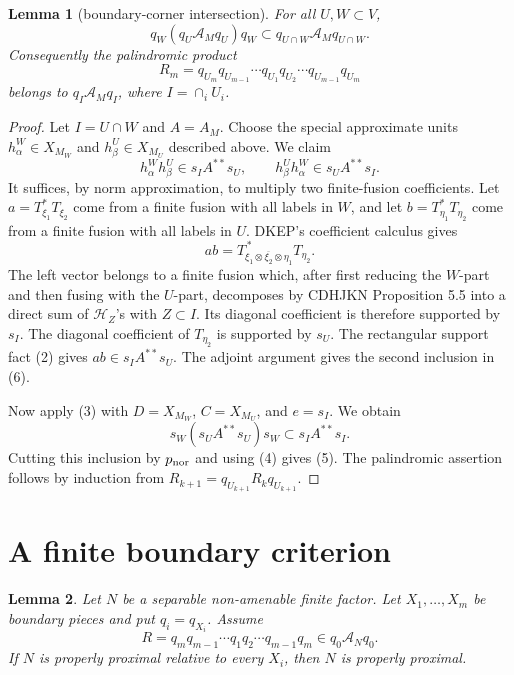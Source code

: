 \documentclass[12pt]{article}
\newtheorem{lemma}{Lemma}
\newcommand{\cA}{\mathcal A}
\newcommand{\cH}{\mathcal H}
\begin{document}
\begin{lemma}[boundary-corner intersection]\label{lem:intersection}
For all \(U,W\subset V\),
\[
        q_W(q_U\cA_Mq_U)q_W\subset q_{U\cap W}\cA_Mq_{U\cap W}.   \tag{5}
\]
Consequently the palindromic product
\[
R_m=q_{U_m}q_{U_{m-1}}\cdots q_{U_1}q_{U_2}\cdots q_{U_{m-1}}q_{U_m}
\]
belongs to \(q_I\cA_Mq_I\), where \(I=\cap_iU_i\).
\end{lemma}

\begin{proof}
Let \(I=U\cap W\) and \(A=A_M\).  Choose the special approximate units
\(h_\alpha^W\in X_{M_W}\) and \(h_\beta^U\in X_{M_U}\) described above.  We
claim
\[
        h_\alpha^Wh_\beta^U\in s_IA^{**}s_U,\qquad
        h_\beta^Uh_\alpha^W\in s_UA^{**}s_I .                    \tag{6}
\]
It suffices, by norm approximation, to multiply two finite-fusion coefficients.
Let \(a=T_{\xi_1}^*T_{\xi_2}\) come from a finite fusion with all labels in
\(W\), and let \(b=T_{\eta_1}^*T_{\eta_2}\) come from a finite fusion with all
labels in \(U\).  DKEP's coefficient calculus gives
\[
        ab=T_{\xi_1\otimes\overline{\xi_2}\otimes\eta_1}^{\,*}
             T_{\eta_2}.                                      \tag{7}
\]
The left vector belongs to a finite fusion which, after first reducing the
\(W\)-part and then fusing with the \(U\)-part, decomposes by CDHJKN Proposition
5.5 into a direct sum of \(\cH_Z\)'s with \(Z\subset I\).  Its diagonal
coefficient is therefore supported by \(s_I\).  The diagonal coefficient of
\(T_{\eta_2}\) is supported by \(s_U\).  The rectangular support fact (2) gives
\(ab\in s_IA^{**}s_U\).  The adjoint argument gives the second inclusion in
(6).

Now apply (3) with \(D=X_{M_W}\), \(C=X_{M_U}\), and \(e=s_I\).  We obtain
\[
        s_W(s_UA^{**}s_U)s_W\subset s_IA^{**}s_I .
\]
Cutting this inclusion by \(p_{\rm nor}\) and using (4) gives (5).  The
palindromic assertion follows by induction from
\(R_{k+1}=q_{U_{k+1}}R_kq_{U_{k+1}}\).
\end{proof}

\section*{A finite boundary criterion}

\begin{lemma}\label{lem:finite}
Let \(N\) be a separable non-amenable finite factor.  Let \(X_1,\ldots,X_m\) be
boundary pieces and put \(q_i=q_{X_i}\).  Assume
\[
        R=q_mq_{m-1}\cdots q_1q_2\cdots q_{m-1}q_m\in q_0\cA_Nq_0. \tag{8}
\]
If \(N\) is properly proximal relative to every \(X_i\), then \(N\) is properly
proximal.
\end{lemma}
\end{document}
